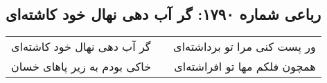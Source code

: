 \begin{center}
\section*{رباعی شماره ۱۷۹۰: گر آب دهی نهال خود کاشته‌ای}
\label{sec:1790}
\begin{longtable}{l p{0.5cm} r}
گر آب دهی نهال خود کاشته‌ای
&&
ور پست کنی مرا تو برداشته‌ای
\\
خاکی بودم به زیر پاهای خسان
&&
همچون فلکم مها تو افراشته‌ای
\\
\end{longtable}
\end{center}
